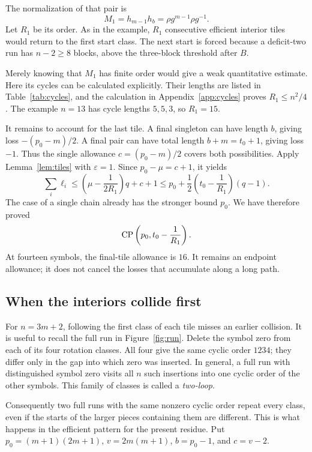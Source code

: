 The normalization of that pair is
\begin{equation}\label{eq:efficient-map}
 M_1=h_{m-1}h_b=\rho g^{m-1}\rho g^{-1}.
\end{equation}
Let $R_1$ be its order. As in the example, $R_1$ consecutive efficient
interior tiles would return to the first start class. The next start
is forced because a deficit-two run has $n-2\ge8$ blocks, above the
three-block threshold after $B$.

Merely knowing that $M_1$ has finite order would give a weak quantitative
estimate. Here its cycles can be calculated explicitly. Their lengths
are listed in Table~\ref{tab:cycles}, and the calculation in
Appendix~\ref{app:cycles} proves $R_1\le n^2/4$. The example $n=13$
has cycle lengths $5,5,3$, so $R_1=15$.

It remains to account for the last tile. A final singleton can have
length $b$, giving loss $-(p_0-m)/2$. A final pair can have total
length $b+m=t_0+1$, giving loss $-1$. Thus the single allowance
$c=(p_0-m)/2$ covers both possibilities. Apply Lemma~\ref{lem:tiles}
with $\varepsilon=1$. Since $p_0-\mu=c+1$, it yields
\[
 \sum_i\ell_i\le
 \left(\mu-\frac1{2R_1}\right)q+c+1
 \le p_0+\frac12\left(t_0-\frac1{R_1}\right)(q-1).
\]
The case of a single chain already has the stronger bound $p_0$.
We have therefore proved
\begin{equation}\label{eq:CP1}
 \operatorname{CP}\left(p_0,t_0-\frac1{R_1}\right).
\end{equation}
At fourteen symbols, the final-tile allowance is $16$. It remains an
endpoint allowance; it does not cancel the losses that accumulate along
a long path.

\subsection{When the interiors collide first}

For $n=3m+2$, following the first class of each tile misses an earlier
collision. It is useful to recall the full run in Figure~\ref{fig:run}.
Delete the symbol zero from each of its four rotation classes. All four
give the same cyclic order $1234$; they differ only in the gap into which
zero was inserted. In general, a full run with distinguished symbol zero
visits all $n$ such insertions into one cyclic order of the other symbols.
This family of classes is called a \emph{two-loop}.

Consequently two full runs with the same nonzero cyclic order repeat
every class, even if the starts of the larger pieces containing them
are different. This is what happens in the efficient pattern for the
present residue. Put $p_0=(m+1)(2m+1)$, $v=2m(m+1)$, $b=p_0-1$,
and $c=v-2$.

